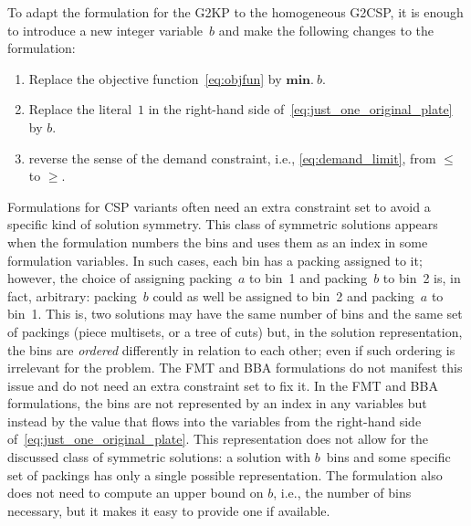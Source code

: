 To adapt the formulation for the G2KP to the homogeneous G2CSP, it is enough to introduce a new integer variable~\(b\) and make the following changes to the formulation:

\begin{enumerate}
\item Replace the objective function~\eqref{eq:objfun} by \(\bm{min.}~b\).
\item Replace the literal~\(1\) in the right-hand side of~\eqref{eq:just_one_original_plate} by \(b\).
\item reverse the sense of the demand constraint, i.e., \cref{eq:demand_limit}, from \(\leq\) to \(\geq\).
\end{enumerate}

Formulations for CSP variants often need an extra constraint set to avoid a specific kind of solution symmetry.
This class of symmetric solutions appears when the formulation numbers the bins and uses them as an index in some formulation variables.
In such cases, each bin has a packing assigned to it; however, the choice of assigning packing~\(a\) to bin~1 and packing~\(b\) to bin~2 is, in fact, arbitrary: packing~\(b\) could as well be assigned to bin~2 and packing~\(a\) to bin~1.
This is, two solutions may have the same number of bins and the same set of packings (piece multisets, or a tree of cuts) but, in the solution representation, the bins are \emph{ordered} differently in relation to each other; even if such ordering is irrelevant for the problem.
The FMT and BBA formulations do not manifest this issue and do not need an extra constraint set to fix it.
In the FMT and BBA formulations, the bins are not represented by an index in any variables but instead by the value that flows into the variables from the right-hand side of~\eqref{eq:just_one_original_plate}.
This representation does not allow for the discussed class of symmetric solutions: a solution with \(b\)~bins and some specific set of packings has only a single possible representation.
The formulation also does not need to compute an upper bound on \(b\), i.e., the number of bins necessary, but it makes it easy to provide one if available.


